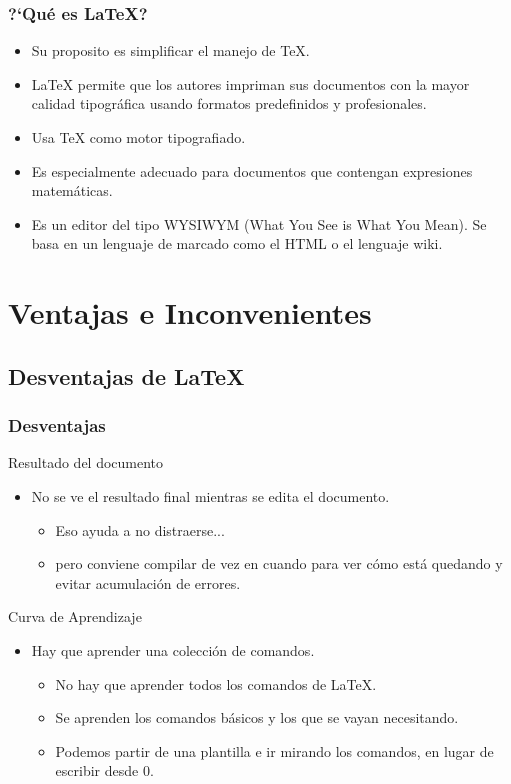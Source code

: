 \documentclass[aspectratio=1610]{beamer}%
\begin{document}
\begin{frame}[fragile]
\frametitle{\textbf{?`Qué es \LaTeX{}?}}
\justifying
 \begin{itemize}\justifying
  \item Su proposito es simplificar el manejo de \TeX{}.
  \item \LaTeX{} permite que los autores impriman sus documentos con la mayor calidad tipográfica usando formatos predefinidos y profesionales.
  \item Usa \TeX{} como motor tipografiado.
  \item Es especialmente adecuado para documentos que contengan expresiones matemáticas.
  \item Es un editor del tipo WYSIWYM (What You See is What You Mean). Se basa en un lenguaje de marcado como el HTML o el lenguaje wiki.
\end{itemize}

\end{frame}

\section{Ventajas e Inconvenientes}
\subsection{Desventajas de \LaTeX{}}
 \begin{frame}[fragile]
\frametitle{\textbf{Desventajas}}
\justifying
\begin{block}{Resultado del documento}
\begin{itemize}\justifying
  \item No se ve el resultado final mientras se edita el documento.
  \begin{itemize}\justifying
  \item Eso ayuda a no distraerse...
  \item pero conviene compilar de vez en cuando para ver cómo está quedando y evitar acumulación de errores.
\end{itemize}

\end{itemize}
	
\end{block}
\begin{block}{Curva de Aprendizaje}
\begin{itemize}\justifying
  \item Hay que aprender una colección de comandos.
  \begin{itemize}\justifying
  \item No hay que aprender todos los comandos de \LaTeX{}.
  \item Se aprenden los comandos básicos y los que se vayan necesitando.
  \item Podemos partir de una plantilla e ir mirando los comandos, en lugar de escribir desde 0.
\end{itemize}
\end{itemize}
\end{block}
\end{frame}
\end{document}
